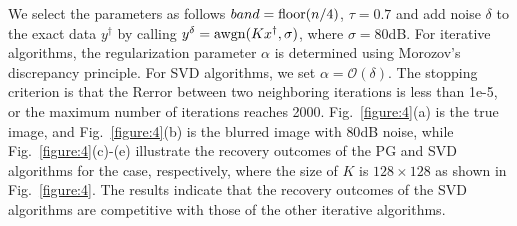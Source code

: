 \documentclass[a4paper,12pt]{article}
\numberwithin{equation}{section}
\begin{document}
\par We select the parameters as follows $band={\rm floor}(n/4)$, $\tau=0.7$ and add noise $\delta$ to the exact data $y^{\dag}$ by calling $y^{\delta}={\rm awgn}(Kx^{\dag},\sigma)$, where $\sigma=80$dB. For iterative algorithms, the regularization parameter $\alpha$ is determined using Morozov's discrepancy principle. For SVD algorithms, we set $\alpha=\mathcal{O}\left(\delta\right)$. The stopping criterion is that the Rerror between two neighboring iterations is less than 1e-5, or the maximum number of iterations reaches 2000. Fig.\ \ref{figure:4}(a) is the true image, and Fig.\ \ref{figure:4}(b) is the blurred image with $80$dB noise, while Fig.\ \ref{figure:4}(c)-(e) illustrate the recovery outcomes of the PG and SVD algorithms for the case, respectively, where the size of $K$ is $128\times128$ as shown in Fig.\ \ref{figure:4}. The results indicate that the recovery outcomes of the SVD algorithms are competitive with those of the other iterative algorithms.

\begin{table}[H]
\caption{The Rerror and the running time of different algorithms for deblurring with different sizes of $K$ when $\sigma=80$dB.}
\label{table:3}
\centering
\tabcolsep=0.35cm
\linewidth
{}
\end{table}
\end{document}
